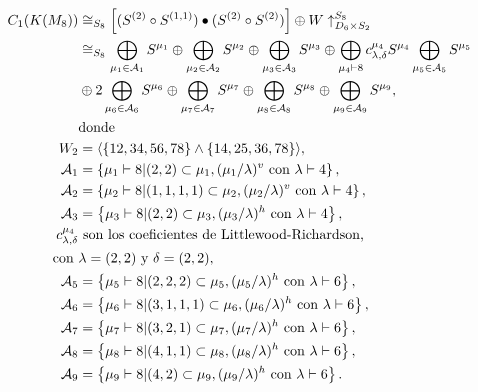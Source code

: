 \documentclass[12pt]{book}
\theoremstyle{definition}
\newcounter{in}
\begin{document}
\begin{equation}
\begin{aligned}
C_{1}(K(M_{8})) & \cong_{S_{8}} \left [ (S^{(2)} \circ S^{(1,1)}) \bullet (S^{(2)} \circ S^{(2)})  \right ]  \oplus W \uparrow_{D_{6} \times S_{2}}^{S_{8}} \\
& \cong_{S_{8}} \bigoplus_{\mu_{1} \in \mathcal{A}_{1}} S^{\mu_{1}} \oplus \bigoplus_{\mu_{2}\in \mathcal{A}_{2}} S^{\mu_{2}} \oplus \bigoplus_{\mu_{3} \in \mathcal{A}_{3}} S^{\mu_{3}} \oplus \bigoplus_{\mu_{4} \vdash 8} c_{\lambda,\delta}^{\mu_{4}}S^{\mu_{4}} \bigoplus_{\mu_{5} \in \mathcal{A}_{5}} S^{\mu_{5}} \\
& \oplus 2\bigoplus_{\mu_{6} \in \mathcal{A}_{6}} S^{\mu_{6}} \oplus \bigoplus_{\mu_{7} \in \mathcal{A}_{7}} S^{\mu_{7}} \oplus \bigoplus_{\mu_{8} \in \mathcal{A}_{8}} S^{\mu_{8}} \oplus \bigoplus_{\mu_{9} \in \mathcal{A}_{9}} S^{\mu_{9}}, \\
& \textup{donde}\\
W_{2} & = \langle \{12,34,56,78\} \wedge \{14,25,36,78\} \rangle, \\ 
\mathcal{A}_{1} & = \left \{ \mu_{1} \vdash 8 | (2,2) \subset \mu_{1}, (\mu_{1} / \lambda)^{v} \textup{ con } \lambda \vdash 4 \right \}, \\
\mathcal{A}_{2} & = \left \{ \mu_{2} \vdash 8 | (1,1,1,1) \subset \mu_{2}, (\mu_{2} / \lambda)^{v} \textup{ con } \lambda \vdash 4 \right \}, \\
\mathcal{A}_{3} & = \left \{ \mu_{3} \vdash 8 | (2,2) \subset \mu_{3}, (\mu_{3} / \lambda)^{h} \textup{ con } \lambda \vdash 4 \right \}, \\
c_{\lambda,\delta}^{\mu_{4}} & \textup{ son los coeficientes de Littlewood-Richardson, } \\
\textup{ con } & \lambda  = (2,2) \textup{ y } \delta = (2,2), \\
\mathcal{A}_{5} & = \left \{ \mu_{5} \vdash 8 | (2,2,2) \subset \mu_{5}, (\mu_{5} / \lambda)^{h} \textup{ con } \lambda \vdash 6 \right \}, \\
\mathcal{A}_{6} & = \left \{ \mu_{6} \vdash 8 | (3,1,1,1) \subset \mu_{6}, (\mu_{6} / \lambda)^{h} \textup{ con } \lambda \vdash 6 \right \}, \\
\mathcal{A}_{7} & = \left \{ \mu_{7} \vdash 8 | (3,2,1) \subset \mu_{7}, (\mu_{7} / \lambda)^{h} \textup{ con } \lambda \vdash 6 \right \}, \\
\mathcal{A}_{8} & = \left \{ \mu_{8} \vdash 8 | (4,1,1) \subset \mu_{8}, (\mu_{8} / \lambda)^{h} \textup{ con } \lambda \vdash 6 \right \}, \\
\mathcal{A}_{9} & = \left \{ \mu_{9} \vdash 8 | (4,2) \subset \mu_{9}, (\mu_{9} / \lambda)^{h} \textup{ con } \lambda \vdash 6 \right \}.
\end{aligned}
\end{equation}
\end{document}

